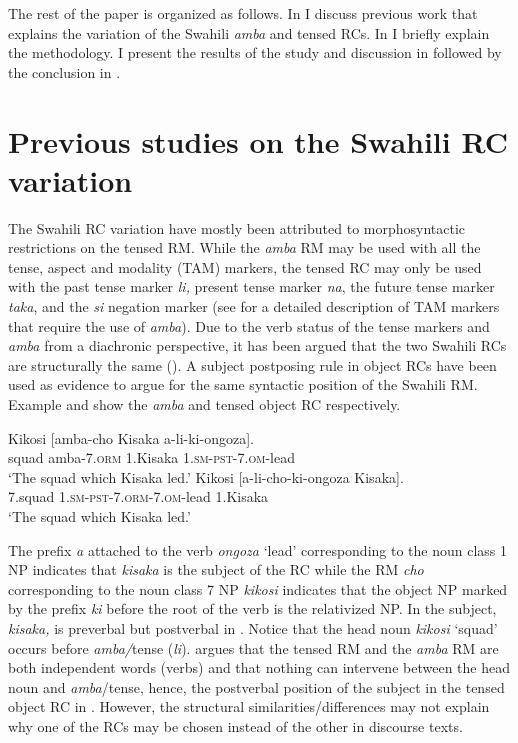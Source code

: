 \documentclass[output=paper,colorlinks,citecolor=brown]{langscibook}
\begin{document}
The rest of the paper is organized as follows. In  I discuss previous work that explains the variation of the Swahili \textit{amba} and tensed RCs. In  I briefly explain the methodology. I present the results of the study and discussion in  followed by the conclusion in .

\section{Previous studies on the Swahili RC variation}\label{sec:mwamzandi:2}

The Swahili RC variation have mostly been attributed to morphosyntactic restrictions on the tensed RM. While the \textit{amba} RM may be used with all the tense, aspect and modality (TAM) markers, the tensed RC may only be used with the past tense marker \textit{li,} present tense marker \textit{na}, the future tense marker \textit{taka}, and the \textit{si} negation marker (see \citealt{Keach1985} for a detailed description of TAM markers that require the use of \textit{amba}). Due to the verb status of the tense markers and \textit{amba} from a diachronic perspective, it has been argued that the two Swahili RCs are structurally the same (\citealt{Vitale1981, Keach1985, DemuthHarford1999, Ngonyani2001, Ngonyani2006}). A subject postposing rule in object RCs have been used as evidence to argue for the same syntactic position of the Swahili RM. Example  and  show the \textit{amba} and tensed object RC respectively.

\ea%
    \label{ex:mwamzandi:6}
    \gll    Kikosi [amba-cho Kisaka a-li-ki-ongoza].\\
            squad  amba\textsc{-7.orm}  1.Kisaka  \textsc{1.sm-pst-7.om-}lead\\
    \glt    ‘The squad which Kisaka led.’
\ex%
    \label{ex:mwamzandi:7}
    \gll    Kikosi  [a-li-cho-ki-ongoza Kisaka].\\
            7.squad  \textsc{1.sm-pst-7.orm-7.om-}lead  1.Kisaka\\
    \glt    ‘The squad which Kisaka led.’
\z

The prefix \textit{a} attached to the verb \textit{ongoza} ‘lead’ corresponding to the noun class 1 NP indicates that \textit{kisaka} is the subject of the RC while the RM \textit{cho} corresponding to the noun class 7 NP \textit{kikosi} indicates that the object NP marked by the prefix \textit{ki} before the root of the verb is the relativized NP. In  the subject, \textit{kisaka,} is preverbal but postverbal in . Notice that the head noun \textit{kikosi} ‘squad’ occurs before \textit{amba/}tense (\textit{li}). \citet{Keach1985} argues that the tensed RM and the \textit{amba} RM are both independent words (verbs) and that nothing can intervene between the head noun and \textit{amba}/tense, hence, the postverbal position of the subject in the tensed object RC in . However, the structural similarities/differences may not explain why one of the RCs may be chosen instead of the other in discourse texts. 
\end{document}

